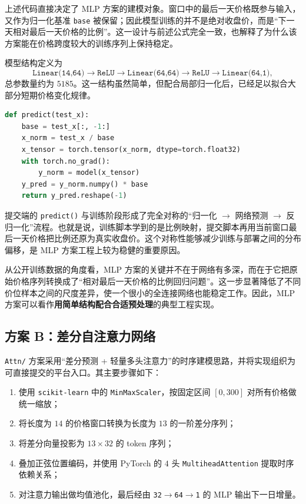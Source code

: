 上述代码直接决定了 MLP 方案的建模对象。窗口中的最后一天价格既参与输入，又作为归一化基准 \texttt{base} 被保留；因此模型训练的并不是绝对收盘价，而是“下一天相对最后一天价格的比例”。这一设计与前述公式完全一致，也解释了为什么该方案能在价格跨度较大的训练序列上保持稳定。

模型结构定义为
\[
\texttt{Linear(14,64)} \rightarrow \texttt{ReLU} \rightarrow
\texttt{Linear(64,64)} \rightarrow \texttt{ReLU} \rightarrow
\texttt{Linear(64,1)},
\]
总参数量约为 $5185$。这一结构虽然简单，但配合局部归一化后，已经足以拟合大部分短期价格变化规律。

\begin{lstlisting}[language=Python,caption={MLP 提交接口中的预测还原逻辑}]
def predict(test_x):
    base = test_x[:, -1:]
    x_norm = test_x / base
    x_tensor = torch.tensor(x_norm, dtype=torch.float32)
    with torch.no_grad():
        y_norm = model(x_tensor)
    y_pred = y_norm.numpy() * base
    return y_pred.reshape(-1)
\end{lstlisting}

提交端的 \texttt{predict()} 与训练阶段形成了完全对称的“归一化 $\rightarrow$ 网络预测 $\rightarrow$ 反归一化”流程。也就是说，训练脚本学到的是比例映射，提交脚本再用当前窗口最后一天价格把比例还原为真实收盘价。这个对称性能够减少训练与部署之间的分布偏移，是 MLP 方案工程上较为稳健的重要原因。

从公开训练数据的角度看，MLP 方案的关键并不在于网络有多深，而在于它把原始价格序列转换成了“相对最后一天价格的比例回归问题”。这一步显著降低了不同价位样本之间的尺度差异，使一个很小的全连接网络也能稳定工作。因此，MLP 方案可以看作\textbf{用简单结构配合合适预处理}的典型工程实现。

\subsection{方案 B：差分自注意力网络}

\texttt{Attn/} 方案采用“差分预测 + 轻量多头注意力”的时序建模思路，并将实现组织为可直接提交的平台入口。其主要步骤如下：
\begin{enumerate}
    \item 使用 \texttt{scikit-learn} 中的 \texttt{MinMaxScaler}，按固定区间 $[0,300]$ 对所有价格做统一缩放；
    \item 将长度为 $14$ 的价格窗口转换为长度为 $13$ 的一阶差分序列；
    \item 将差分向量投影为 $13 \times 32$ 的 token 序列；
    \item 叠加正弦位置编码，并使用 PyTorch 的 $4$ 头 \texttt{MultiheadAttention} 提取时序依赖关系；
    \item 对注意力输出做均值池化，最后经由 \texttt{32$\rightarrow$64$\rightarrow$1} 的 MLP 输出下一日增量。
\end{enumerate}

